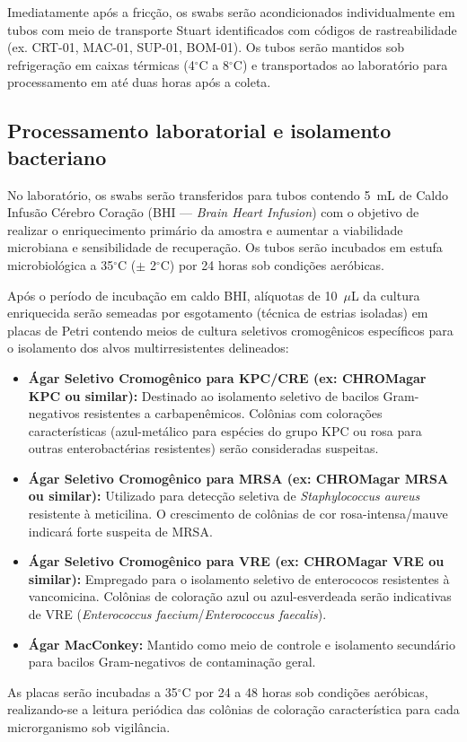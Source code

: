 \documentclass[12pt,a4paper]{article}
\newcommand{\celsius}{$^\circ$C}
\begin{document}
Imediatamente após a fricção, os swabs serão acondicionados individualmente em tubos com meio de transporte Stuart identificados com códigos de rastreabilidade (ex. CRT-01, MAC-01, SUP-01, BOM-01). Os tubos serão mantidos sob refrigeração em caixas térmicas (4\celsius{} a 8\celsius{}) e transportados ao laboratório para processamento em até duas horas após a coleta.

\subsection{Processamento laboratorial e isolamento bacteriano}
No laboratório, os swabs serão transferidos para tubos contendo 5~mL de Caldo Infusão Cérebro Coração (BHI --- \textit{Brain Heart Infusion}) com o objetivo de realizar o enriquecimento primário da amostra e aumentar a viabilidade microbiana e sensibilidade de recuperação. Os tubos serão incubados em estufa microbiológica a 35\celsius{} ($\pm$ 2\celsius{}) por 24 horas sob condições aeróbicas.

Após o período de incubação em caldo BHI, alíquotas de 10~$\mu$L da cultura enriquecida serão semeadas por esgotamento (técnica de estrias isoladas) em placas de Petri contendo meios de cultura seletivos cromogênicos específicos para o isolamento dos alvos multirresistentes delineados:
\begin{itemize}
    \item \textbf{Ágar Seletivo Cromogênico para KPC/CRE (ex: CHROMagar KPC ou similar):} Destinado ao isolamento seletivo de bacilos Gram-negativos resistentes a carbapenêmicos. Colônias com colorações características (azul-metálico para espécies do grupo KPC ou rosa para outras enterobactérias resistentes) serão consideradas suspeitas.
    \item \textbf{Ágar Seletivo Cromogênico para MRSA (ex: CHROMagar MRSA ou similar):} Utilizado para detecção seletiva de \textit{Staphylococcus aureus} resistente à meticilina. O crescimento de colônias de cor rosa-intensa/mauve indicará forte suspeita de MRSA.
    \item \textbf{Ágar Seletivo Cromogênico para VRE (ex: CHROMagar VRE ou similar):} Empregado para o isolamento seletivo de enterococos resistentes à vancomicina. Colônias de coloração azul ou azul-esverdeada serão indicativas de VRE (\textit{Enterococcus faecium}/\textit{Enterococcus faecalis}).
    \item \textbf{Ágar MacConkey:} Mantido como meio de controle e isolamento secundário para bacilos Gram-negativos de contaminação geral.
\end{itemize}
As placas serão incubadas a 35\celsius{} por 24 a 48 horas sob condições aeróbicas, realizando-se a leitura periódica das colônias de coloração característica para cada microrganismo sob vigilância.
\end{document}
